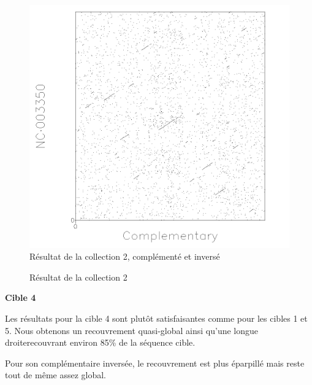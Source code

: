\begin{figure}[!ht]
\begin{minipage}[c]{.46 \linewidth}
\begin{center}
			\includegraphics[scale= 0.4]{../res/cible2-ic.png}
			Résultat de la collection 2, complémenté et inversé
		\end{center}
	\end{minipage}
	\caption{Résultat de la collection 2}
\end{figure}

\FloatBarrier

\noindent\textbf{Cible 4}

Les résultats pour la cible 4 sont plutôt satisfaisantes comme pour les cibles 1
et 5. Nous obtenons un recouvrement quasi-global ainsi qu'une longue droiterecouvrant environ 85\% de la séquence cible.

Pour son complémentaire inversée, le recouvrement est plus éparpillé mais reste
tout de même assez global.

